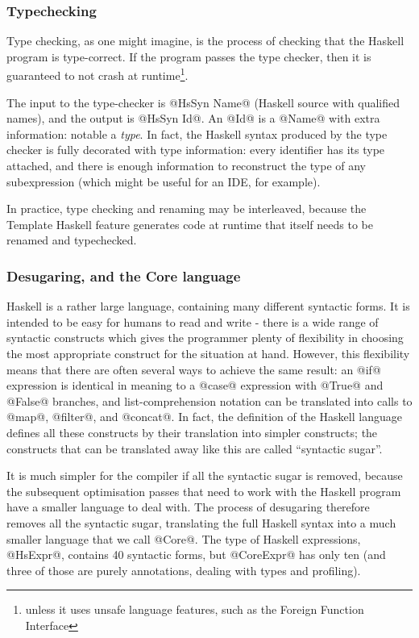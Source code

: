 \documentclass{article}
\begin{document}
\subsubsection{Typechecking}

Type checking, as one might imagine, is the process of checking that
the Haskell program is type-correct.  If the program passes the type
checker, then it is guaranteed to not crash at runtime\footnote{unless
  it uses unsafe language features, such as the Foreign Function
  Interface}.

The input to the type-checker is @HsSyn Name@ (Haskell source with
qualified names), and the output is @HsSyn Id@.  An @Id@ is a @Name@
with extra information: notable a \emph{type}.  In fact, the Haskell
syntax produced by the type checker is fully decorated with type
information: every identifier has its type attached, and there is
enough information to reconstruct the type of any subexpression
(which might be useful for an IDE, for example).

In practice, type checking and renaming may be interleaved, because
the Template Haskell feature generates code at runtime that itself
needs to be renamed and typechecked.

\subsubsection{Desugaring, and the Core language}

Haskell is a rather large language, containing many different
syntactic forms.  It is intended to be easy for humans to read and
write - there is a wide range of syntactic constructs which gives the
programmer plenty of flexibility in choosing the most appropriate
construct for the situation at hand.  However, this flexibility means
that there are often several ways to achieve the same result: an @if@
expression is identical in meaning to a @case@ expression with @True@
and @False@ branches, and list-comprehension notation can be
translated into calls to @map@, @filter@, and @concat@.  In fact, the
definition of the Haskell language defines all these constructs by
their translation into simpler constructs; the constructs that can be
translated away like this are called ``syntactic sugar''.

It is much simpler for the compiler if all the syntactic sugar is
removed, because the subsequent optimisation passes that need to work
with the Haskell program have a smaller language to deal with.  The
process of desugaring therefore removes all the syntactic sugar,
translating the full Haskell syntax into a much smaller language that
we call @Core@.  The type of Haskell expressions, @HsExpr@, contains
40 syntactic forms, but @CoreExpr@ has only ten (and three of those
are purely annotations, dealing with types and profiling).
\end{document}
